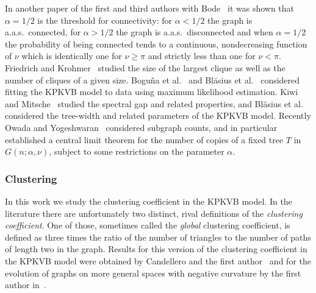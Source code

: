 In another paper of the first and third authors with Bode~\cite{bode2016probability} it was shown that $\alpha=1/2$ is the threshold for connectivity: for $\alpha < 1/2$ the graph is a.a.s.~connected, for $\alpha>1/2$ the graph is a.a.s.~disconnected and when $\alpha=1/2$ the probability of being connected tends to a continuous, nondecreasing function of $\nu$ which is identically one for $\nu \geq \pi$ and strictly less than one for $\nu < \pi$. Friedrich and Krohmer~\cite{blasius2018cliques} studied the size of the largest clique as well as the number of cliques of a given size. Bogu\~{n}a et al.~\cite{boguna2010sustaining} and Bl\"asius et al.~\cite{blasius2018efficient} considered fitting the KPKVB model to data using maximum likelihood estimation. Kiwi and Mitsche~\cite{kiwi2018spectral} studied the spectral gap and related properties, and Bl\"asius et al.\cite{blasius2016hyperbolic} considered the tree-width and related parameters of the KPKVB model. Recently Owada and Yogeshwaran~\cite{owada2018sub} considered subgraph counts, and in particular established a central limit theorem for the number of copies of a fixed tree $T$ in $G(n;\alpha,\nu)$, subject to some restrictions on the parameter $\alpha$.

\subsubsection*{Clustering}

In this work we study the clustering coefficient in the KPKVB model. In the literature there are unfortunately two distinct, rival definitions of the {\em clustering coefficient}. One of those, sometimes called the {\em global} clustering coefficient, is defined as three times the ratio of the number of triangles to the number of paths of length two in the graph. Results for this version of the clustering coefficient in the KPKVB model were obtained by Candellero and the first author~\cite{candellero2016clustering} and for the evolution of graphs on more general spaces with negative curvature by the first author in~\cite{fountoulakis2012evolution}. 

